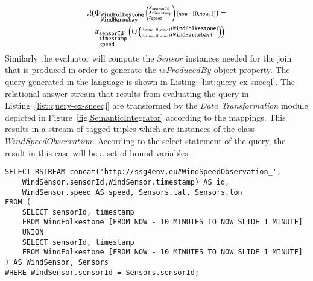 \begin{align*}
\lambda ( &\Phi_{ 
			\begin{subarray}{l}
			\mathtt{WindFolkestone}\\
			\mathtt{WindHernebay}
			\end{subarray}}
\left(
\begin{subarray}{l}
x_{\mathtt{sensorId}}\\x_{\mathtt{timestamp}}\\z_{\mathtt{speed}}
\end{subarray}
\right) {\scriptstyle [now-10,now,1]} ) =  \\ 
&\pi_{
\begin{subarray}{l}
\mathtt{sensorId}\\
\mathtt{timestamp}\\
\mathtt{speed}
\end{subarray}}
\left( \cup \left( 
	\begin{subarray}{l}
		\omega_{now-10,now,1}( \mathtt{WindFolkestone}) \\
		\omega_{now-10,now,1}(\mathtt{WindHernebay})
	\end{subarray}
\right) \right)
\end{align*}
Similarly the evaluator will compute the $Sensor$ instances needed for the join that is produced in order to generate the $isProducedBy$ object property.
The query generated in the \sneeql language is shown in Listing~\ref{list:query-ex-sneeql}.
The relational answer stream that results from evaluating the query in Listing~\ref{list:query-ex-sneeql} are transformed by the \textit{Data Transformation} module depicted in Figure~\ref{fig:SemanticIntegrator} according to the \stwoo mappings.
This results in a stream of tagged triples which are instances of the class $WindSpeedObservation$. According to the select statement of the \sparqlstr query, the result in this case will be a set of bound variables.

\begin{lstlisting}[style=SNEEqlStyle,language=SNEEql,frame=none,float,label=list:query-ex-sneeql,caption=The \sneeql query that is generated for the input query in Listing~\ref{list:query-example}.]
SELECT RSTREAM concat('http://ssg4env.eu#WindSpeedObservation_',
	WindSensor.sensorId,WindSensor.timestamp) AS id, 
	WindSensor.speed AS speed, Sensors.lat, Sensors.lon
FROM (
	SELECT sensorId, timestamp 
	FROM WindFolkestone [FROM NOW - 10 MINUTES TO NOW SLIDE 1 MINUTE] 
	UNION 
	SELECT sensorId, timestamp 
	FROM WindFolkestone [FROM NOW - 10 MINUTES TO NOW SLIDE 1 MINUTE] 
) AS WindSensor, Sensors 
WHERE WindSensor.sensorId = Sensors.sensorId; 
\end{lstlisting}







